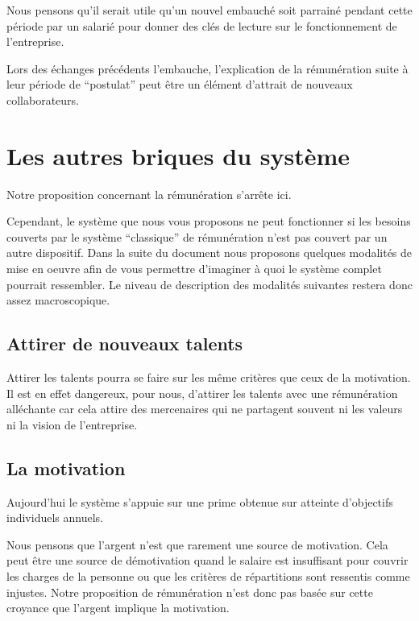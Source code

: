 \documentclass[12pt]{article}
\begin{document}
 Nous pensons qu’il serait utile qu’un nouvel embauché soit parrainé pendant cette période par un salarié pour donner des clés de lecture sur le fonctionnement de l’entreprise.

 Lors des échanges précédents l’embauche, l’explication de la rémunération suite à leur période de “postulat” peut être un élément d’attrait de nouveaux collaborateurs. 

\section{Les autres briques du système}

 Notre proposition concernant la rémunération s’arrête ici. 

 Cependant, le système que nous vous proposons ne peut fonctionner si les besoins couverts par le système “classique” de rémunération n’est pas couvert par un autre dispositif. Dans la suite du document nous proposons quelques modalités de mise en oeuvre afin de vous permettre d’imaginer à quoi le système complet pourrait ressembler. Le niveau de description des modalités suivantes restera donc assez macroscopique.

\subsection{Attirer de nouveaux talents}

 Attirer les talents pourra se faire sur les même critères que ceux de la motivation. Il est en effet dangereux, pour nous, d’attirer les talents avec une rémunération alléchante car cela attire des mercenaires qui ne partagent souvent ni les valeurs ni la vision de l’entreprise.

\subsection{La motivation}

 Aujourd’hui le système s’appuie sur une prime obtenue sur atteinte d’objectifs individuels annuels. 

 Nous pensons que l’argent n’est que rarement une source de motivation. Cela peut être une source de démotivation quand le salaire est insuffisant pour couvrir les charges de la personne ou que les critères de répartitions sont ressentis comme injustes. Notre proposition de rémunération n’est donc pas basée sur cette croyance que l’argent implique la motivation. 
\end{document}

